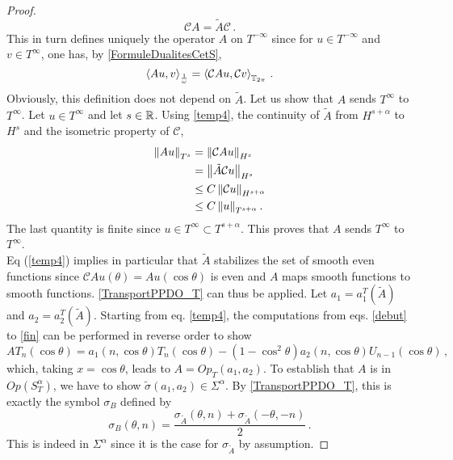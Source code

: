 \documentclass[a4paper]{article}
\begin{document}
\begin{proof}
\begin{equation}
	\mathcal{C}A = \tilde{A}\mathcal{C}\,.
	\label{temp4}
	\end{equation}
	This in turn defines uniquely the operator $A$ on $T^{-\infty}$ since for $u \in T^{-\infty}$ and $v \in T^{\infty}$, one has, by \autoref{FormuleDualitesCetS},
	\[\left\langle Au,v\right\rangle_\frac{1}{\omega} = \left\langle \mathcal{C}Au,\mathcal{C}v\right\rangle_{\mathbb{T}_{2\pi}}\,.\]
	Obviously, this definition does not depend on $\tilde{A}$. Let us show that $A$ sends $T^{\infty}$ to $T^{\infty}$. Let $u \in T^{\infty}$ and let $s\in \mathbb{R}$. Using \eqref{temp4}, the continuity of $\tilde{A}$ from $H^{s+\alpha}$ to $H^{s}$ and the isometric property of $\mathcal{C}$,  
	\[\begin{split}
		\left\|Au\right\|_{T^s} &= \left\|\mathcal{C}Au\right\|_{H^s}\\
		&= \left\|\tilde{A}\mathcal{C}u\right\|_{H^s}\\
		& \leq C \left\|\mathcal{C}u\right\|_{H^{s + \alpha}}\\
		& \leq C \left\|u\right\|_{T^{s + \alpha}}.
	\end{split}\]
	The last quantity is finite since $u \in T^{\infty} \subset T^{s+\alpha}$. This proves that $A$ sends $T^\infty$ to $T^\infty$. \\
	Eq (\ref{temp4}) implies in particular that $\tilde{A}$ stabilizes the set of smooth even functions since $\mathcal{C}Au(\theta) = Au(\cos\theta)$ is even and $A$ maps smooth functions to smooth functions. \autoref{TransportPPDO_T} can thus be applied. Let $a_1 = a_1^T(\tilde{A})$ and $a_2 = a_2^T(\tilde{A})$. Starting from eq. \eqref{temp4}, the computations from eqs. \eqref{debut} to \eqref{fin} can be performed in reverse order to show
	\[AT_n(\cos \theta) = a_1(n,\cos\theta) T_n(\cos\theta) -(1 - \cos^2\theta) a_2(n,\cos\theta) U_{n-1}(\cos\theta)\,,\]
	which, taking $x = \cos\theta$, leads to $A = \textit{Op}_T(a_1,a_2)$. To establish that $A$ is in $\textit{Op}(S^\alpha_T)$, we have to show $\tilde{\sigma}(a_1,a_2) \in  \Sigma^\alpha$. By \autoref{TransportPPDO_T}, this is exactly the symbol $\sigma_B$ defined by 
	\[\sigma_B(\theta,n) = \frac{\sigma_{\tilde{A}}(\theta,n) + \sigma_{\tilde{A}}(-\theta,-n)}{2}\,.\] 
	This is indeed in $\Sigma^\alpha$ since it is the case for $\sigma_{\tilde{A}}$ by assumption. 
\end{proof}
\end{document}

